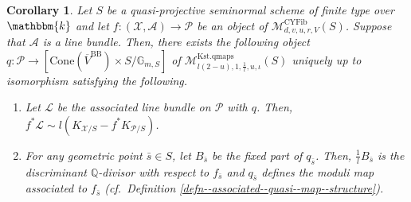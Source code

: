 \documentclass[12pt,twoside]{amsart}
\newtheorem{cor}[thm]{Corollary}
\theoremstyle{definition}
\begin{document}
    \begin{cor}
Let $S$ be a quasi-projective seminormal scheme of finite type over $\mathbbm{k}$ and let $f\colon(\mathcal{X},\mathcal{A})\to\mathcal{P}$ be an object of $\mathcal{M}_{d,v,u,r,V}^{\mathrm{CYFib}}(S)$.
        Suppose that $\mathcal{A}$ is a line bundle.
Then, there exists the following object $q\colon \mathcal{P}\to [\mathrm{Cone}(\overline{V}^{\mathrm{BB}})\times S/\mathbb{G}_{m,S}]$ of $\mathcal{M}_{l(2-u),1,\frac{1}{l},u,\iota}^{\mathrm{Kst.qmaps}}(S)$ uniquely up to isomorphism satisfying the following. 
\begin{enumerate}
\item Let $\mathscr{L}$ be the associated line bundle on $\mathcal{P}$ with $q$. Then, $f^*\mathscr{L}\sim l(K_{\mathcal{X}/S}-f^*K_{\mathcal{P}/S})$.
\item For any geometric point $\bar{s}\in S$, let $B_{\bar{s}}$ be the fixed part of $q_{\bar{s}}$.
Then, $\frac{1}{l}B_{\bar{s}}$ is the discriminant $\mathbb{Q}$-divisor with respect to $f_{\bar{s}}$ and $q_{\bar{s}}$ defines the moduli map associated to $f_{\bar{s}}$ (cf.~Definition \ref{defn--associated--quasi--map--structure}).
\end{enumerate}       
    \end{cor}
 
\end{document}
